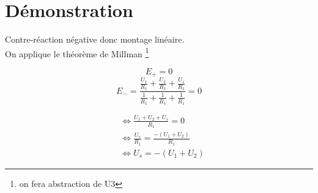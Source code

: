 \section{Démonstration}

Contre-réaction négative donc montage linéaire. \\
On applique le théorème de Millman \footnote{on fera abstraction de U3}

$$E_+=0$$
$$ E_- = \frac{ \frac{U_1}{R_1} + \frac{U_2}{R_1} + \frac{U_s}{R_1} }{\frac{1}{R_1} + \frac{1}{R_1} + \frac{1}{R_1}}=0$$

\begin{align}
&\Leftrightarrow \frac{U_1+U_2+U_s}{R_1}=0 \\
&\Leftrightarrow \frac{U_s}{R_1} = \frac{-(U_1+U_2)}{R_1} \\
&\Leftrightarrow U_s = -(U_1+U_2)
\end{align}

